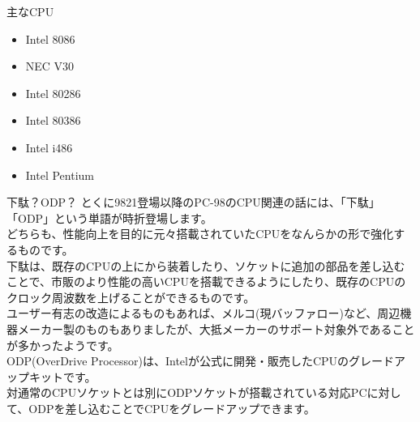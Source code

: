 \documentclass[b5paper,9pt,platex,dvipdfmx]{jsarticle}
\begin{document}
\begin{multicols}{3}
\begin{enumerate}
\begin{itembox}[l]{主なCPU}
  \begin{itemize}
    \item Intel 8086
    \item NEC V30
    \item Intel 80286
    \item Intel 80386
    \item Intel i486
    \item Intel Pentium
  \end{itemize}
\end{itembox}
\begin{itembox}[l]{下駄？ODP？}
とくに9821登場以降のPC-98のCPU関連の話には、「下駄」「ODP」という単語が時折登場します。\\
どちらも、性能向上を目的に元々搭載されていたCPUをなんらかの形で強化するものです。\\
下駄は、既存のCPUの上にから装着したり、ソケットに追加の部品を差し込むことで、市販のより性能の高いCPUを搭載できるようにしたり、既存のCPUのクロック周波数を上げることができるものです。\\
ユーザー有志の改造によるものもあれば、メルコ(現バッファロー)など、周辺機器メーカー製のものもありましたが、大抵メーカーのサポート対象外であることが多かったようです。\\
ODP(OverDrive Processor)は、Intelが公式に開発・販売したCPUのグレードアップキットです。\\
対通常のCPUソケットとは別にODPソケットが搭載されている対応PCに対して、ODPを差し込むことでCPUをグレードアップできます。\\
\end{itembox}


\end{enumerate}
\end{multicols}
\end{document}
